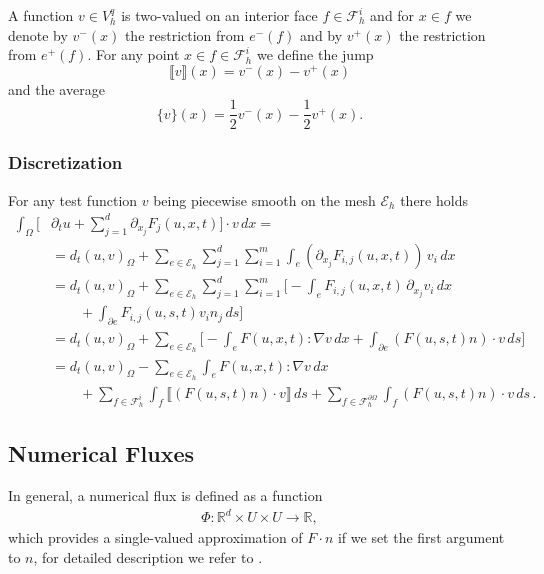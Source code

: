 \documentclass[a4paper,12pt]{article}
\theoremstyle{definition}
\theoremstyle{definition}
\newcommand{\Dim}{d}
\begin{document}
A function $v\in V_h^q$ is two-valued on an interior face $f\in\mathcal{F}_h^i$ and
for $x\in f$ we denote by $v^-(x)$ the restriction from $e^-(f)$ and by
$v^+(x)$ the restriction from $e^+(f)$.
For any point $x\in f \in \mathcal{F}_h^i$ we define the jump
\begin{equation}
\llbracket v \rrbracket (x) = v^-(x)-v^+(x)
\end{equation}
and the average
\begin{equation}
\{ v \} (x) = \frac12 v^-(x) - \frac12 v^+(x) .
\end{equation}


\subsubsection*{Discretization}

For any test function $v$ being piecewise smooth
on the mesh $\mathcal{E}_h$ there holds
\begin{equation}\label{eq:DG_identity}
\begin{split}
\int_\Omega \biggl[&\partial_t u + \sum_{j=1}^{\Dim}\partial_{x_j}F_j(u,x,t)\biggr]\cdot v \,dx = \\
&= d_t (u,v)_\Omega + \sum_{e\in\mathcal{E}_h} \sum_{j=1}^{\Dim} \sum_{i=1}^m
\int_e (\partial_{x_j}F_{i,j}(u,x,t)) \, v_i \,dx \\
&= d_t (u,v)_\Omega + \sum_{e\in\mathcal{E}_h} \sum_{j=1}^{\Dim} \sum_{i=1}^m
\biggl[ - \int_e F_{i,j}(u,x,t) \,\partial_{x_j} v_i \,dx \\
&\qquad+ \int_{\partial e} F_{i,j}(u,s,t) v_i n_j\,ds \biggr]\\
&= d_t (u,v)_\Omega + \sum_{e\in\mathcal{E}_h}  \biggl[-\int_e F(u,x,t) : \nabla v\,dx
+ \int_{\partial e} (F(u,s,t)n)\cdot v\,ds\biggr]\\
&= d_t (u,v)_\Omega - \sum_{e\in\mathcal{E}_h} \int_e F(u,x,t) : \nabla v\,dx\\
&\qquad + \sum_{f\in\mathcal{F}_h^i} \int_f \llbracket (F(u,s,t)n)\cdot v \rrbracket \,ds
+ \sum_{f\in\mathcal{F}_h^{\partial\Omega}} \int_f (F(u,s,t)n)\cdot v \,ds \,.
\end{split}
\end{equation}

\subsection{Numerical Fluxes}

In general, a numerical flux is defined as a function
\begin{align}
\Phi :  \mathbb{R}^d \times U \times U \rightarrow \mathbb{R},
\end{align}
which provides a single-valued approximation of $F \cdot n$ if we set the first argument to $n$, for detailed description we refer to \cite{DiPietro}.
\end{document}
